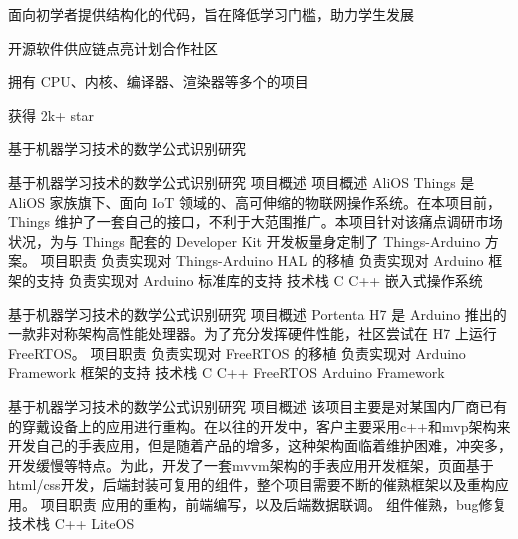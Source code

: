 \documentclass[]{deedy-resume-openfont}
\begin{document}
\begin{minipage}[t]{0.73\textwidth}
\begin{tightemize}
    \item 面向初学者提供结构化的代码，旨在降低学习门槛，助力学生发展
    \item 开源软件供应链点亮计划合作社区
    \item 拥有 CPU、内核、编译器、渲染器等多个的项目
    \item 获得 2k+ star
    \end{tightemize}
\sectionsep

\begin{tightemize}
    \item 基于机器学习技术的数学公式识别研究
    \end{tightemize}
\sectionsep

\begin{tightemize}
    \item 基于机器学习技术的数学公式识别研究
    项目概述
    项目概述
    AliOS Things 是 AliOS 家族旗下、面向 IoT 领域的、高可伸缩的物联网操作系统。在本项目前，Things 维护了一套自己的接口，不利于大范围推广。本项目针对该痛点调研市场状况，为与 Things 配套的 Developer Kit 开发板量身定制了 Things-Arduino 方案。
    项目职责
    负责实现对 Things-Arduino HAL 的移植
    负责实现对 Arduino 框架的支持
    负责实现对 Arduino 标准库的支持
    技术栈
    C
    C++
    嵌入式操作系统
\end{tightemize}
\sectionsep

\begin{tightemize}
    \item 基于机器学习技术的数学公式识别研究
    项目概述
    Portenta H7 是 Arduino 推出的一款非对称架构高性能处理器。为了充分发挥硬件性能，社区尝试在 H7 上运行 FreeRTOS。
    项目职责
    负责实现对 FreeRTOS 的移植
    负责实现对 Arduino Framework 框架的支持
    技术栈
    C
    C++
    FreeRTOS
    Arduino Framework
\end{tightemize}
\sectionsep

\begin{tightemize}
    \item 基于机器学习技术的数学公式识别研究
    项目概述
    该项目主要是对某国内厂商已有的穿戴设备上的应用进行重构。在以往的开发中，客户主要采用c++和mvp架构来开发自己的手表应用，但是随着产品的增多，这种架构面临着维护困难，冲突多，开发缓慢等特点。为此，开发了一套mvvm架构的手表应用开发框架，页面基于html/css开发，后端封装可复用的组件，整个项目需要不断的催熟框架以及重构应用。
    项目职责
    应用的重构，前端编写，以及后端数据联调。
    组件催熟，bug修复
    技术栈
    C++
    LiteOS
\end{tightemize}
\sectionsep


\end{minipage}
\end{document}
